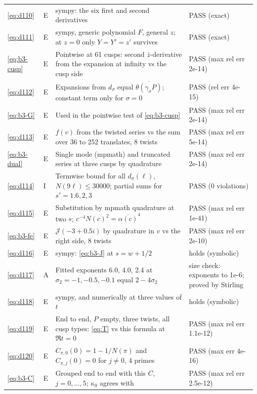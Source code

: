 \documentclass[11pt]{article}
\numberwithin{equation}{section}
\begin{document}
\begin{longtable}{@{}>{\raggedright\arraybackslash}p{1.2cm}>{\centering\arraybackslash}p{0.7cm}>{\raggedright\arraybackslash}p{9.05cm}>{\raggedright\arraybackslash}p{4.3cm}@{}}
\eqref{eq:d110} & E & sympy: the six first and second derivatives & PASS (exact)\\
\eqref{eq:d111} & E & sympy, generic polynomial $F$, general $z$; at $z=0$ only $Y=Y'=z'$ survives & PASS (exact)\\
\eqref{eq:b3-cusp} & E & Pointwise at 61 cusps: second $\bar z$-derivative from the expansion at infinity vs the cusp side & PASS (max rel err 2e-14)\\
\eqref{eq:d112} & E & Expansions from $d_\sigma$ equal $\overline{\theta(\gamma_\sigma P)}$; constant term only for $\sigma=0$ & PASS (rel err 4e-15)\\
\eqref{eq:b3-G} & E & Used in the pointwise test of \eqref{eq:b3-cusp} & PASS (max rel err 2e-14)\\
\eqref{eq:d113} & E & $f(v)$ from the twisted series vs the sum over 36 to 252 translates, 8 twists & PASS (max rel err 5e-14)\\
\eqref{eq:b3-dual} & E & Single mode (mpmath) and truncated series at three cusps by quadrature & PASS (max rel err 2e-14)\\
\eqref{eq:d114} & I & Termwise bound for all $d_\sigma(\ell)$, $N(9\ell)\le30000$; partial sums for $s'=1.6,2,3$ & PASS (0 violations)\\
\eqref{eq:d115} & E & Substitution by mpmath quadrature at two $s$; $c^{-4}N(c)^2=\overline{\alpha(c)}^4$ & PASS (max rel err 1e-41)\\
\eqref{eq:b3-fe} & E & $\mathcal J(-3+0.5i)$ by quadrature in $v$ vs the right side, 8 twists & PASS (max rel err 2e-10)\\
\eqref{eq:d116} & E & sympy: \eqref{eq:b3-J} at $s=w+1/2$ & holds (symbolic)\\
\eqref{eq:d117} & A & Fitted exponents 6.0, 4.0, 2.4 at $\sigma_2=-1,-0.5,-0.1$ equal $2-4\sigma_2$ & size check: exponents to 1e-6; proved by Stirling\\
\eqref{eq:d118} & E & sympy, and numerically at three values of $t$ & holds (symbolic)\\
\eqref{eq:d119} & E & End to end, $P$ empty, three twists, all cusp types: \eqref{eq:T} vs this formula at $\Re t=0$ & PASS (max rel err 1.1e-12)\\
\eqref{eq:d120} & E & $C_{\pi,0}(0)=1-1/N(\pi)$ and $C_{\pi,j}(0)=0$ for $j\ne0$, 4 primes & PASS (max err 4e-16)\\
\eqref{eq:b3-C} & E & Grouped end to end with this $C$, $j=0,\dots,5$; $\kappa_0$ agrees with \cite[(A.10)]{OAI1112} & PASS (max rel err 2.5e-12)\\

\end{longtable}
\end{document}

